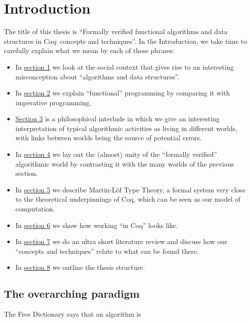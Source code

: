 \documentclass[declaration,mgr,english,shortabstract]{iithesis}
\author         {Wojciech Kołowski}
\date           {\sout{Czerwiec '20 chyba że koronawirus} \\ \sout{Jednak raczej wrzesień} \\ \sout{Z września też nici, ale spoko} \\ Może w marcu '21 się uda.} %
\begin{document}

\chapter{Introduction} \label{ch1}

The title of this thesis is ``Formally verified functional algorithms and data structures in Coq: concepts and techniques''. In the Introduction, we take time to carefully explain what we mean by each of these phrases:

\begin{itemize}
    \item In \hyperref[paradigm]{section 1} we look at the social context that gives rise to an interesting misconception about ``algorithms and data structures''.
    \item In \hyperref[impfun]{section 2} we explain ``functional'' programming by comparing it with imperative programming.
    \item \hyperref[worlds]{Section 3} is a philosophical interlude in which we give an interesting interpretation of typical algorithmic activities as living in different worlds, with links between worlds being the source of potential errors.
    \item In \hyperref[formal]{section 4} we lay out the (almost) unity of the ``formally verified'' algorithmic world by contrasting it with the many worlds of the previous section.
    \item In \hyperref[mltt]{section 5} we describe Martin-L\"{o}f Type Theory, a formal system very close to the theoretical underpinnings of Coq, which can be seen as our model of computation.
    \item In \hyperref[coq]{section 6} we show how working ``in Coq'' looks like.
    \item In \hyperref[literature]{section 7} we do an ultra short literature review and discuss how our ``concepts and techniques'' relate to what can be found there.
    \item In \hyperref[outline]{section 8} we outline the thesis structure.
\end{itemize}

\section{The overarching paradigm} \label{paradigm}

The Free Dictionary says \cite{TheFreeDictionary} that an algorithm is
\end{document}
